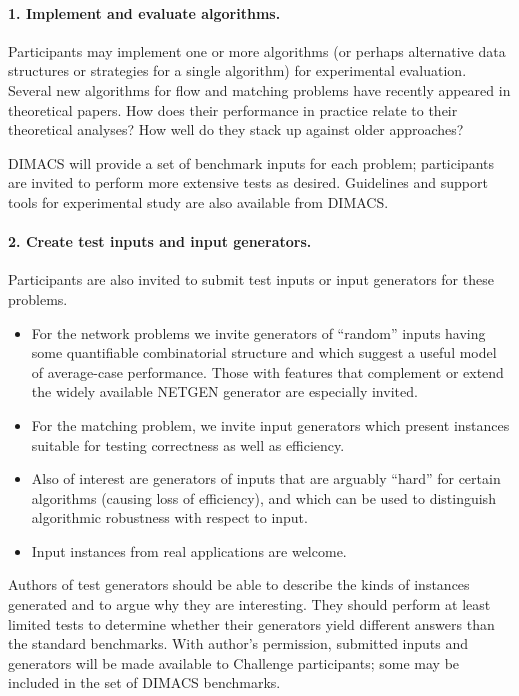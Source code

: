\paragraph{1. Implement and evaluate algorithms.}

Participants may implement 
one or more algorithms (or perhaps alternative data structures or 
strategies for a single algorithm) for experimental evaluation. 
Several new algorithms for flow and matching problems have recently
appeared in theoretical papers.  How does their performance in practice
relate to their theoretical analyses?  How well do they stack up against
older approaches?   

DIMACS will provide a set of benchmark inputs for each problem; 
participants are invited to perform more  
extensive tests as desired. 
Guidelines and support tools for experimental study are 
also available from DIMACS.  

\paragraph{2. Create test inputs and input generators.}

Participants are also invited to submit test inputs or input generators for 
these problems. 
\begin{itemize}
\item For the network problems 
we invite generators of ``random'' inputs having some quantifiable 
combinatorial structure and which suggest a useful model 
of average-case performance. 
Those with features that complement or extend the 
widely available NETGEN \cite{kns} generator are especially invited. 

\item For the matching problem, we invite input generators 
which present instances suitable for testing correctness as well 
as efficiency. 

\item Also of interest are generators of inputs that are arguably ``hard'' 
for certain algorithms (causing loss of efficiency), and which can be 
used to distinguish algorithmic robustness with respect to input. 

\item Input instances from real applications are welcome. 
\end{itemize} 

Authors of test generators should be able to describe the kinds of 
instances generated and to argue why they are interesting.  They 
should perform at least limited tests to determine whether their generators
yield different answers than the standard benchmarks.  
With author's permission, submitted inputs and generators 
will be made available to Challenge participants;  some may be 
included in the set of DIMACS benchmarks.  

